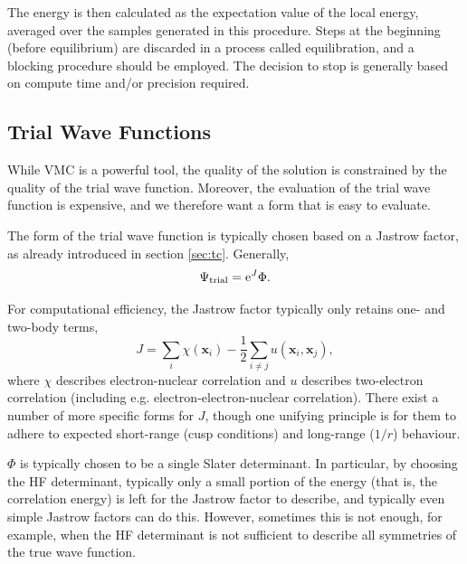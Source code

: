 The energy is then calculated as the expectation value of the local energy, averaged over the samples generated in this procedure. Steps at the beginning (before equilibrium) are discarded in a process called equilibration,\supercite{needsVariational2020} and a blocking procedure should be employed. The decision to stop is generally based on compute time and/or precision required.

\subsection{Trial Wave Functions}
\label{sec:jastrow}

While \gls{VMC} is a powerful tool, the quality of the solution is constrained by the quality of the trial wave function. Moreover, the evaluation of the trial wave function is expensive, and we therefore want a form that is easy to evaluate.

The form of the trial wave function is typically chosen based on a Jastrow factor, as already introduced in section \ref{sec:tc}. Generally,\supercite{jastrowManyBody1955}
\begin{equation}
    \label{eq:slater-jastrow}
    \Psi_\mathrm{trial} = \mathrm{e}^J\Phi.
\end{equation}

For computational efficiency, the Jastrow factor typically only retains one- and two-body terms,\supercite{foulkesQuantum}
\begin{equation}
    J = \sum_i \chi(\bm x_i) - \frac 12 \sum_{i\neq j} u(\bm x_i, \bm x_j),
\end{equation}
where $\chi$ describes electron-nuclear correlation and $u$ describes two-electron correlation (including e.g. electron-electron-nuclear correlation). There exist a number of more specific forms for $J$,\supercite{lopezriosFramework2012} though one unifying principle is for them to adhere to expected short-range (cusp conditions) and long-range ($1/r$) behaviour.

$\Phi$ is typically chosen to be a single Slater determinant.\supercite{foulkesQuantum,fahyVariational1988,liCohesive1991,rajagopalQuantum1994,malatestaVariational1997}
In particular, by choosing the \gls{HF} determinant, typically only a small portion of the energy (that is, the correlation energy) is left for the Jastrow factor to describe, and typically even simple Jastrow factors can do this.\supercite{foulkesQuantum}
However, sometimes this is not enough, for example, when the HF determinant is not sufficient to describe all symmetries of the true wave function.\supercite{harrisonQuantum1985,lesterRecent1997,umrigarDiffusion1993}

